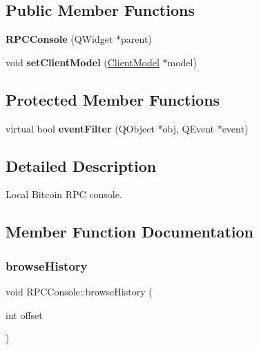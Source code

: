 \subsection*{Public Member Functions}
\begin{DoxyCompactItemize}
\item 
\mbox{\label{class_r_p_c_console_aeac546e68f8c2cafa79a0294dd78f2ad}} 
{\bfseries R\+P\+C\+Console} (Q\+Widget $\ast$parent)
\item 
\mbox{\label{class_r_p_c_console_a355349a33664a07628e9ca22a60f5fa7}} 
void {\bfseries set\+Client\+Model} (\mbox{\hyperlink{class_client_model}{Client\+Model}} $\ast$model)
\end{DoxyCompactItemize}
\subsection*{Protected Member Functions}
\begin{DoxyCompactItemize}
\item 
\mbox{\label{class_r_p_c_console_a81ce4c9d95e3de6de4c46ec272ae91ba}} 
virtual bool {\bfseries event\+Filter} (Q\+Object $\ast$obj, Q\+Event $\ast$event)
\end{DoxyCompactItemize}


\subsection{Detailed Description}
Local Bitcoin R\+PC console. 

\subsection{Member Function Documentation}
\mbox{\label{class_r_p_c_console_a1c2ccbaedfeb8ed8cd3f73307a38bd7f}} 
\subsubsection{\texorpdfstring{browse\+History}{browseHistory}}
{\footnotesize\ttfamily void R\+P\+C\+Console\+::browse\+History (\begin{DoxyParamCaption}\item[{int}]{offset }\end{DoxyParamCaption})\hspace{0.3cm}{\ttfamily [slot]}}

